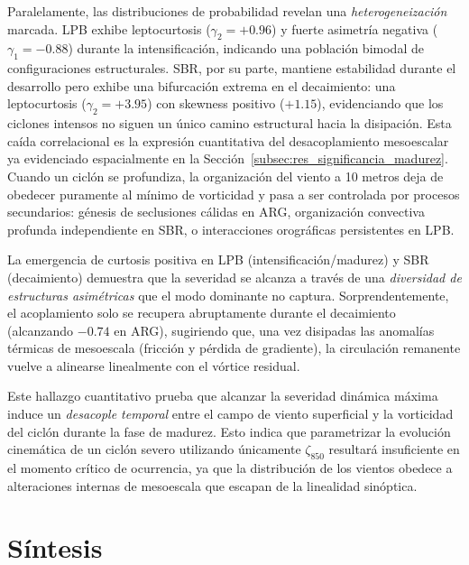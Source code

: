 

Paralelamente, las distribuciones de probabilidad revelan una \textit{heterogeneización} marcada. 
LPB exhibe leptocurtosis ($\gamma_2 = +0.96$) y fuerte asimetría negativa ($\gamma_1 = -0.88$) durante la intensificación, indicando una población bimodal de configuraciones estructurales. 
SBR, por su parte, mantiene estabilidad durante el desarrollo pero exhibe una bifurcación extrema en el decaimiento: una leptocurtosis ($\gamma_2 = +3.95$) con skewness positivo ($+1.15$), evidenciando que los ciclones intensos no siguen un único camino estructural hacia la disipación.
Esta caída correlacional es la expresión cuantitativa del desacoplamiento mesoescalar ya evidenciado espacialmente en la Sección~\ref{subsec:res_significancia_madurez}. 
Cuando un ciclón se profundiza, la organización del viento a 10 metros deja de obedecer puramente al mínimo de vorticidad y pasa a ser controlada por procesos secundarios: génesis de seclusiones cálidas en ARG, organización convectiva profunda independiente en SBR, o interacciones orográficas persistentes en LPB. 

La emergencia de curtosis positiva en LPB (intensificación/madurez) y SBR (decaimiento) demuestra que la severidad se alcanza a través de una \textit{diversidad de estructuras asimétricas} que el modo dominante no captura. 
Sorprendentemente, el acoplamiento solo se recupera abruptamente durante el decaimiento (alcanzando $-0.74$ en ARG), sugiriendo que, una vez disipadas las anomalías térmicas de mesoescala (fricción y pérdida de gradiente), la circulación remanente vuelve a alinearse linealmente con el vórtice residual.



Este hallazgo cuantitativo prueba que alcanzar la severidad dinámica máxima induce un \textit{desacople temporal} entre el campo de viento superficial y la vorticidad del ciclón durante la fase de madurez.
Esto indica que parametrizar la evolución cinemática de un ciclón severo utilizando únicamente $\zeta_{850}$ resultará insuficiente en el momento crítico de ocurrencia, ya que la distribución de los vientos obedece a alteraciones internas de mesoescala que escapan de la linealidad sinóptica. 

\section{Síntesis}\label{sec:sintesis_wind10}

